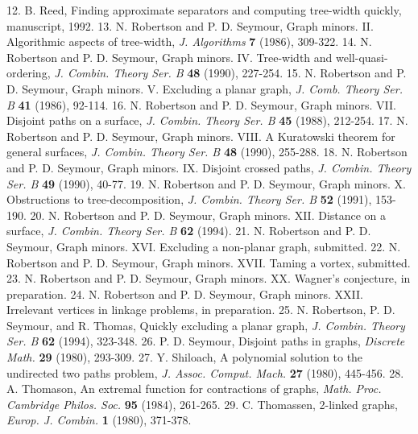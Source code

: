 12. B. Reed, Finding approximate separators and computing tree-width quickly, manuscript, 1992. 13. N. Robertson and P. D. Seymour, Graph minors. II. Algorithmic aspects of tree-width, \textit{J. Algorithms} \textbf{7} (1986), 309-322. 14. N. Robertson and P. D. Seymour, Graph minors. IV. Tree-width and well-quasi-ordering, \textit{J. Combin. Theory Ser. B} \textbf{48} (1990), 227-254. 15. N. Robertson and P. D. Seymour, Graph minors. V. Excluding a planar graph, \textit{J. Comb. Theory Ser. B} \textbf{41} (1986), 92-114. 16. N. Robertson and P. D. Seymour, Graph minors. VII. Disjoint paths on a surface, \textit{J. Combin. Theory Ser. B} \textbf{45} (1988), 212-254. 17. N. Robertson and P. D. Seymour, Graph minors. VIII. A Kuratowski theorem for general surfaces, \textit{J. Combin. Theory Ser. B} \textbf{48} (1990), 255-288. 18. N. Robertson and P. D. Seymour, Graph minors. IX. Disjoint crossed paths, \textit{J. Combin. Theory Ser. B} \textbf{49} (1990), 40-77. 19. N. Robertson and P. D. Seymour, Graph minors. X. Obstructions to tree-decomposition, \textit{J. Combin. Theory Ser. B} \textbf{52} (1991), 153-190. 20. N. Robertson and P. D. Seymour, Graph minors. XII. Distance on a surface, \textit{J. Combin. Theory Ser. B} \textbf{62} (1994). 21. N. Robertson and P. D. Seymour, Graph minors. XVI. Excluding a non-planar graph, submitted. 22. N. Robertson and P. D. Seymour, Graph minors. XVII. Taming a vortex, submitted. 23. N. Robertson and P. D. Seymour, Graph minors. XX. Wagner's conjecture, in preparation. 24. N. Robertson and P. D. Seymour, Graph minors. XXII. Irrelevant vertices in linkage problems, in preparation. 25. N. Robertson, P. D. Seymour, and R. Thomas, Quickly excluding a planar graph, \textit{J. Combin. Theory Ser. B} \textbf{62} (1994), 323-348. 26. P. D. Seymour, Disjoint paths in graphs, \textit{Discrete Math.} \textbf{29} (1980), 293-309. 27. Y. Shiloach, A polynomial solution to the undirected two paths problem, \textit{J. Assoc. Comput. Mach.} \textbf{27} (1980), 445-456. 28. A. Thomason, An extremal function for contractions of graphs, \textit{Math. Proc. Cambridge Philos. Soc.} \textbf{95} (1984), 261-265. 29. C. Thomassen, 2-linked graphs, \textit{Europ. J. Combin.} \textbf{1} (1980), 371-378.
